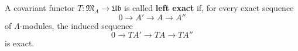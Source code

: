 A covariant functor $T : \mathfrak{M}_A \rightarrow \mathfrak{Ub}$ is called \textbf{left exact} if, for every exact sequence
$$0 \rightarrow A' \rightarrow A \rightarrow A''$$
of $\Lambda$-modules, the induced sequence
$$0 \rightarrow TA' \rightarrow TA \rightarrow TA''$$
is exact.
